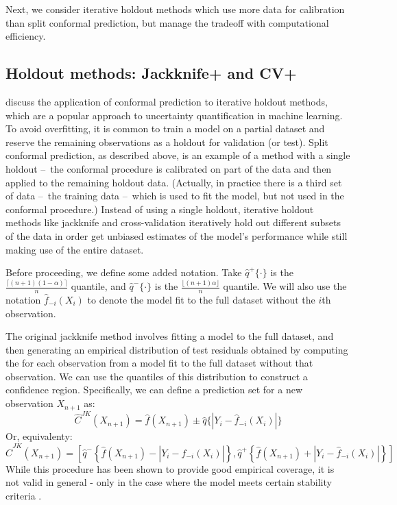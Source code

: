 \documentclass[a4paper, 12pt]{article}
\begin{document}
Next, we consider iterative holdout methods which use more data for calibration than split conformal prediction, but manage the tradeoff with computational efficiency.

\subsection{Holdout methods: Jackknife+ and CV+}
\label{sec:jackknife}
\textcite{barberPredictiveInferenceJackknife2020} discuss the application of conformal prediction to iterative holdout methods, which are a popular approach to uncertainty quantification in machine learning. To avoid overfitting, it is common to train a model on a partial dataset and reserve the remaining observations as a holdout for validation (or test). Split conformal prediction, as described above, is an example of a method with a single holdout --\ the conformal procedure is calibrated on part of the data and then applied to the remaining holdout data. (Actually, in practice there is a third set of data --\ the training data --\ which is used to fit the model, but not used in the conformal procedure.) Instead of using a single holdout, iterative holdout methods like jackknife and cross-validation iteratively hold out different subsets of the data in order get unbiased estimates of the model's performance while still making use of the entire dataset.

Before proceeding, we define some added notation. Take $\hat{q}^+\{\cdot \}$ is the $\frac{\lceil (n+1)(1-\alpha) \rceil }{n}$ quantile, and $\hat{q}^-\{\cdot \}$ is the $\frac{\lfloor (n+1)\alpha \rfloor }{n}$ quantile. We will also use the notation $\hat{f}_{-i}(X_i)$ to denote the model fit to the full dataset without the $i$th observation.

The original jackknife method involves fitting a model to the full dataset, and then generating an empirical distribution of test residuals obtained by computing the for each observation from a model fit to the full dataset without that observation. We can use the quantiles of this distribution to construct a confidence region. Specifically, we can define a prediction set for a new observation $X_{n+1}$ as:
\[ \hat{C}^{JK}(X_{n+1}) = \hat{f}(X_{n+1}) \pm \hat{q}\{ |Y_i - \hat{f}_{-i}(X_i)|\} \]
Or, equivalenty:
\[ \hat{C}^{JK}(X_{n+1}) = \left[ \hat{q}^{-}\left\{ \hat{f}(X_{n+1}) - |Y_i - \hat{f}_{-i}(X_i)|\right\}, \hat{q}^{+}\left\{ \hat{f}(X_{n+1}) + |Y_i - \hat{f}_{-i}(X_i)|\right\} \right] \]
While this procedure has been shown to provide good empirical coverage, it is not valid in general - only in the case where the model meets certain stability criteria \autocite{steinbergerConditionalPredictiveInference2022}.
\end{document}
